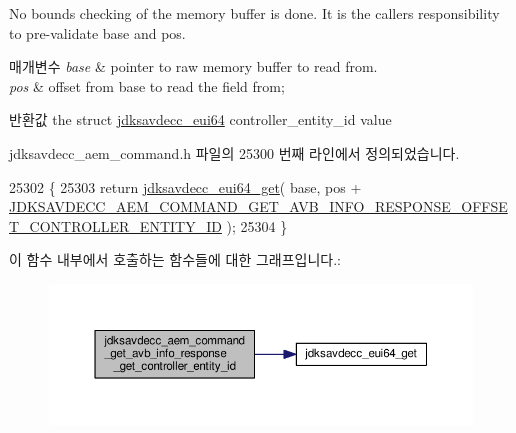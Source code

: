 No bounds checking of the memory buffer is done. It is the caller\textquotesingle{}s responsibility to pre-\/validate base and pos.


\begin{DoxyParams}{매개변수}
{\em base} & pointer to raw memory buffer to read from. \\
\hline
{\em pos} & offset from base to read the field from; \\
\hline
\end{DoxyParams}
\begin{DoxyReturn}{반환값}
the struct \hyperlink{structjdksavdecc__eui64}{jdksavdecc\+\_\+eui64} controller\+\_\+entity\+\_\+id value 
\end{DoxyReturn}


jdksavdecc\+\_\+aem\+\_\+command.\+h 파일의 25300 번째 라인에서 정의되었습니다.


\begin{DoxyCode}
25302 \{
25303     \textcolor{keywordflow}{return} \hyperlink{group__eui64_ga2652311a25a6b91cddbed75c108c7031}{jdksavdecc\_eui64\_get}( base, pos + 
      \hyperlink{group__command__get__avb__info__response_gaf3d9d59d4ba4a2ac515ce70311fdcddd}{JDKSAVDECC\_AEM\_COMMAND\_GET\_AVB\_INFO\_RESPONSE\_OFFSET\_CONTROLLER\_ENTITY\_ID}
       );
25304 \}
\end{DoxyCode}


이 함수 내부에서 호출하는 함수들에 대한 그래프입니다.\+:
\nopagebreak
\begin{figure}[H]
\begin{center}
\leavevmode
\includegraphics[width=350pt]{group__command__get__avb__info__response_ga4aeaaab55be05eed218c88328112e173_cgraph}
\end{center}
\end{figure}


